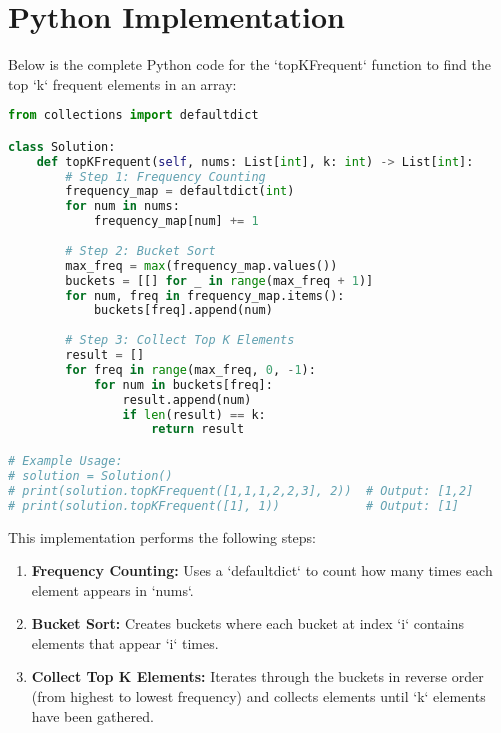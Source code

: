\newpage %
\section*{Python Implementation}

Below is the complete Python code for the `topKFrequent` function to find the top `k` frequent elements in an array:

\begin{fullwidth}
\begin{lstlisting}[language=Python]
from collections import defaultdict

class Solution:
    def topKFrequent(self, nums: List[int], k: int) -> List[int]:
        # Step 1: Frequency Counting
        frequency_map = defaultdict(int)
        for num in nums:
            frequency_map[num] += 1
        
        # Step 2: Bucket Sort
        max_freq = max(frequency_map.values())
        buckets = [[] for _ in range(max_freq + 1)]
        for num, freq in frequency_map.items():
            buckets[freq].append(num)
        
        # Step 3: Collect Top K Elements
        result = []
        for freq in range(max_freq, 0, -1):
            for num in buckets[freq]:
                result.append(num)
                if len(result) == k:
                    return result

# Example Usage:
# solution = Solution()
# print(solution.topKFrequent([1,1,1,2,2,3], 2))  # Output: [1,2]
# print(solution.topKFrequent([1], 1))            # Output: [1]
\end{lstlisting}
\end{fullwidth}

This implementation performs the following steps:
\begin{enumerate}
    \item \textbf{Frequency Counting:} Uses a `defaultdict` to count how many times each element appears in `nums`.
    \item \textbf{Bucket Sort:} Creates buckets where each bucket at index `i` contains elements that appear `i` times.
    \item \textbf{Collect Top K Elements:} Iterates through the buckets in reverse order (from highest to lowest frequency) and collects elements until `k` elements have been gathered.
\end{enumerate}

